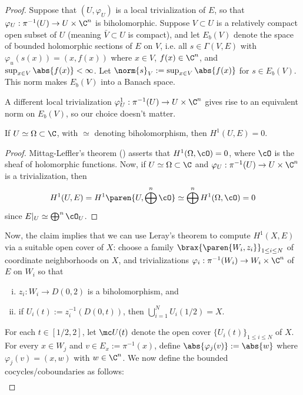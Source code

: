 \documentclass[11pt]{report}
\begin{document}
\begin{proof}
    Suppose that $(U,\varphi_U)$ is a local trivialization of $E$, so that $\varphi_U:\pi^{-1}(U) \to U \times \C^n$ is biholomorphic. Suppose $V \subset U$ is a relatively compact open subset of $U$ (meaning $\bar V \subset U$ is compact), and let $E_b(V)$ denote the space of bounded holomorphic sections of $E$ on $V$, i.e. all $s \in \Gamma(V,E)$ with $\varphi_u(s(x)) =(x,f(x))$ where $x \in V$, $f(x) \in \C^n$, and $\sup_{x \in V}\abs{f(x)}< \infty$. Let $\norm{s}_V:=\sup_{x \in V}\abs{f(x)}$ for $s \in E_b(V)$. This norm makes $E_b(V)$ into a Banach space.
    \begin{notethm*}
        A different local trivialization $\varphi_U^1:\pi^{-1}(U) \to U \times \C^n$ gives rise to an equivalent norm on $E_b(V)$, so our choice doesn't matter.
    \end{notethm*}
    \begin{claim}
        If $U \simeq \Omega \subset \C$, with $\simeq$ denoting biholomorphism, then $H^1(U,E)=0$.
    \end{claim}
    \begin{proof}
        Mittag-Leffler's theorem () asserts that $H^1(\Omega, \cO)=0$, where $\cO$ is the sheaf of holomorphic functions. Now, if $U \simeq \Omega \subset \C$ and $\varphi_U: \pi^{-1}(U) \to U \times \C^n$ is a trivialization, then
        \[
        H^1(U,E) = H^1\paren{ U, \bigoplus^n\cO } \simeq \bigoplus^n H^1(\Omega, \cO) = 0
        \]
        since $E|_U \simeq \bigoplus^n \cO_U$.
    \end{proof}
    Now, the claim implies that we can use Leray's theorem to compute $H^1(X,E)$ via a suitable open cover of $X$: choose a family $\brax{\paren{W_i,z_i}}_{1 \leq i \leq N}$ of coordinate neighborhoods on $X$, and trivializations $\varphi_i: \pi^{-1}(W_i) \to W_i \times \C^n$ of $E$ on $W_i$ so that
    \begin{enumerate}[(i)]
        \item $z_i:W_i \to D(0,2)$ is a biholomorphism, and
        \item if $U_i(t):= z_i^{-1}(D(0,t))$, then $\bigcup_{i=1}^NU_i(1/2)=X$.
    \end{enumerate}
    For each $t \in [1/2,2]$, let $\mc U(t)$ denote the open cover $\{U_i(t)\}_{1 \leq i \leq N}$ of $X$. For every $x \in W_j$ and $v \in E_x:=\pi^{-1}(x)$, define $\abs{\varphi_j(v)}:=\abs{w}$ where $\varphi_j(v)=(x,w)$ with $w \in \C^n$. We now define the bounded cocycles/coboundaries as follows:
    \begin{align*}

\end{align*}
\end{proof}
\end{document}
